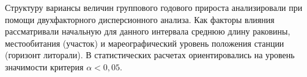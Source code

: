 Структуру вариансы величин группового годового прироста анализировали при помощи двухфакторного дисперсионного анализа. 
Как факторы влияния рассматривали начальную для данного интервала среднюю длину раковины, местообитания (участок) и мареографический уровень положения станции (горизонт литорали). 
В статистических расчетах ориентировались на уровень значимости критерия $\alpha < 0,05$.


